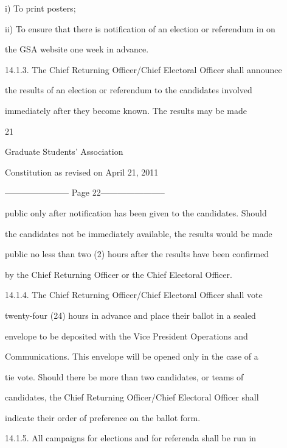 \documentclass{article}
\begin{document}
i)      To print posters;  



ii)     To ensure that there is notification of an election or referendum in on  

the GSA website one week in advance.  



14.1.3.     The Chief Returning Officer/Chief Electoral Officer shall announce  

the  results  of  an  election  or  referendum  to  the  candidates  involved  

immediately  after  they  become  known.  The  results  may  be  made  





     21  



       Graduate Students’ Association  



  Constitution as revised on April 21, 2011  


----------------------- Page 22-----------------------

public only after notification has been given to the candidates. Should  

the candidates not be immediately available, the results would be made  

public no less than two (2) hours after the results have been confirmed  

by the Chief Returning Officer or the Chief Electoral Officer.  



14.1.4.     The  Chief  Returning  Officer/Chief  Electoral  Officer  shall  vote  

twenty-four  (24)  hours  in  advance  and  place  their  ballot  in  a  sealed  

envelope  to  be  deposited  with  the  Vice  President  Operations  and  

Communications. This envelope will be opened only in the case of a  

tie  vote.  Should  there  be  more  than  two  candidates,  or  teams  of  

candidates,  the  Chief  Returning  Officer/Chief  Electoral  Officer  shall  

indicate their order of preference on the ballot form.  



14.1.5.     All  campaigns  for  elections  and  for  referenda  shall  be  run  in  
\end{document}
